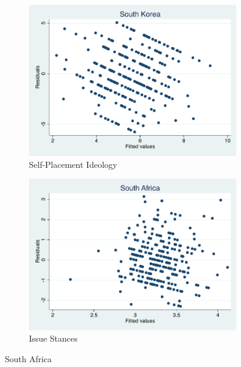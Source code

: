 \documentclass[12pt, titlepage]{article}
\begin{document}
\begin{figure}[H]
	\centering
	\begin{subfigure}[b]{0.475\textwidth}   
		\centering 
		\includegraphics[width=\textwidth]{Residuals/CountryIdeo/SKorea}
		\caption{Self-Placement Ideology}
	\end{subfigure}
	\hfill
	\begin{subfigure}[b]{0.475\textwidth}
		\centering 
		\includegraphics[width=\textwidth]{Residuals/CountryLib/SAfrica}
		\caption{Issue Stances}
	\end{subfigure}
	\caption{South Africa}
	\label{SAfrica}
\end{figure}
\end{document}

